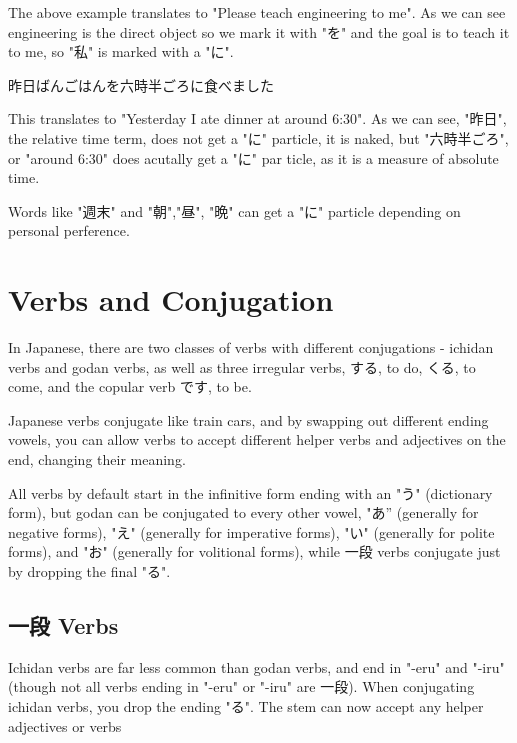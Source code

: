 \documentclass{article}
\begin{document}
\begin{CJK}{UTF8}{min}
The above example translates to "Please teach engineering to me". As we can see engineering is the direct object so we mark it with "を" and the goal is to teach it to me, so "私" is marked with a "に".

\begin{example}
昨日ばんごはんを六時半ごろに食べました
\end{example}

This translates to "Yesterday I ate dinner at around 6:30". As we can see, "昨日", the relative time term, does not get a "に" particle, it is naked, but "六時半ごろ", or "around 6:30" does acutally get a "に" par   ticle, as it is a measure of absolute time. 

Words like "週末" and "朝","昼", "晩" can get a "に" particle depending on personal perference. 


\section{Verbs and Conjugation}


In Japanese, there are two classes of verbs with different conjugations - ichidan verbs and godan verbs, as well as three irregular verbs, する, to do, くる, to come, and the copular verb です, to be. 

Japanese verbs conjugate like train cars, and by swapping out different ending vowels, you can allow verbs to accept different helper verbs and adjectives on the end, changing their meaning.

All verbs by default start in the infinitive form ending with an "う" (dictionary form), but godan can be conjugated to every other vowel, "あ” (generally for negative forms), "え" (generally for imperative forms), "い" (generally for polite forms), and "お" (generally for volitional forms), while 一段 verbs conjugate just by dropping the final "る".

\subsection{一段 Verbs}

Ichidan verbs are far less common than godan verbs, and end in "-eru" and "-iru" (though not all verbs ending in "-eru" or "-iru" are 一段). When conjugating ichidan verbs, you drop the ending "る". The stem can now accept any helper adjectives or verbs


\end{CJK}
\end{document}

